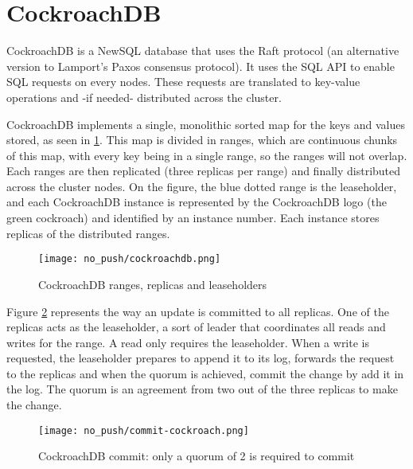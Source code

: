 \section{CockroachDB}
CockroachDB is a NewSQL database that uses the Raft protocol (an alternative version to Lamport's Paxos consensus protocol).
It uses the SQL API to enable SQL requests on every nodes. These requests are translated to key-value operations and -if needed- distributed across the cluster.

CockroachDB implements a single, monolithic sorted map for the keys and values stored, as seen in \ref{fig:cockroachdb}. This map is divided in ranges, which are continuous chunks of this map, with every key being in a single range, so the ranges will not overlap. Each ranges are then replicated (three replicas per range) and finally distributed across the cluster nodes.\cite{CRDB:automatedoperations} On the figure, the blue dotted range is the leaseholder, and each CockroachDB instance is represented by the CockroachDB logo (the green cockroach) and identified by an instance number. Each instance stores replicas of the distributed ranges.

\begin{figure}[H]
  \vspace{-10pt}
  \centering
  \centerline{\texttt{[image: no\_push/cockroachdb.png]}}
  \vspace{-5pt}
  \caption{CockroachDB ranges, replicas and leaseholders}
  \vspace{-5pt}
  \label{fig:cockroachdb}
\end{figure}

Figure \ref{fig:cockroachdb-commit} represents the way an update is committed to all replicas. One of the replicas acts as the leaseholder, a sort of leader that coordinates all reads and writes for the range. A read only requires the leaseholder.
When a write is requested, the leaseholder prepares to append it to its log, forwards the request to the replicas and when the quorum is achieved, commit the change by add it in the log. The quorum is an agreement from two out of the three replicas to make the change.

\begin{figure}[H]
  \vspace{-10pt}
  \centering
  \centerline{\texttt{[image: no\_push/commit-cockroach.png]}}
  \vspace{-5pt}
  \caption{CockroachDB commit: only a quorum of 2 is required to commit }
  \vspace{-5pt}
  \label{fig:cockroachdb-commit}
\end{figure}

